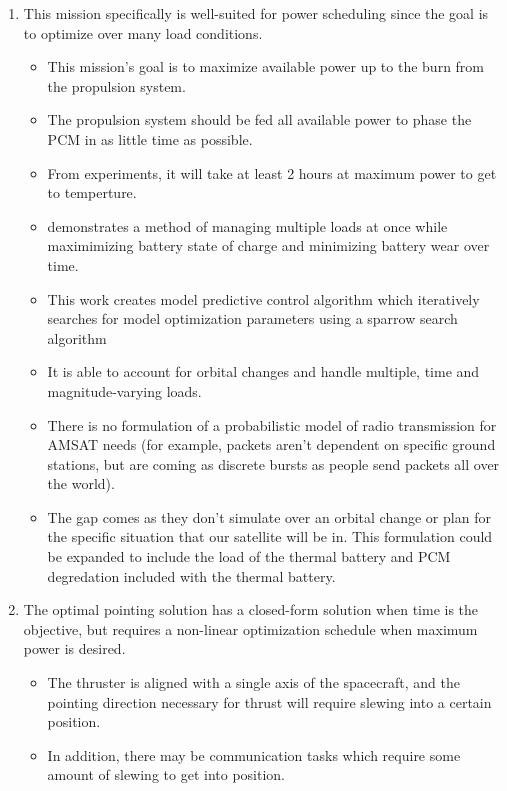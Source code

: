 \begin{enumerate}
\begin{itemize}
    \end{itemize}
    \item This mission specifically is well-suited for power scheduling since the goal is to optimize over many load conditions.
    \begin{itemize}
        \item This mission's goal is to maximize available power up to the burn from the propulsion system.
        \item The propulsion system should be fed all available power to phase the PCM in as little time as possible.
        \item From experiments, it will take at least 2 hours at maximum power to get to temperture.
        \item \cite{akarneSelfAdaptiveEnergyAwarePower2026} demonstrates a method of managing multiple loads at once while maximimizing battery state of charge and minimizing battery wear over time.
        \item This work creates model predictive control algorithm which iteratively searches for model optimization parameters using a sparrow search algorithm
        \item It is able to account for orbital changes and handle multiple, time and magnitude-varying loads.
        \item There is no formulation of a probabilistic model of radio transmission for AMSAT needs (for example, packets aren't dependent on specific ground stations, but are coming as discrete bursts as people send packets all over the world).
        \item The gap comes as they don't simulate over an orbital change or plan for the specific situation that our satellite will be in. This formulation could be expanded to include the load of the thermal battery and PCM degredation included with the thermal battery.
    \end{itemize}
    \item The optimal pointing solution has a closed-form solution when time is the objective, but requires a non-linear optimization schedule when maximum power is desired.
    \begin{itemize}
        \item The thruster is aligned with a single axis of the spacecraft, and the pointing direction necessary for thrust will require slewing into a certain position.
        \item In addition, there may be communication tasks which require some amount of slewing to get into position.

\end{itemize}
\end{enumerate}
